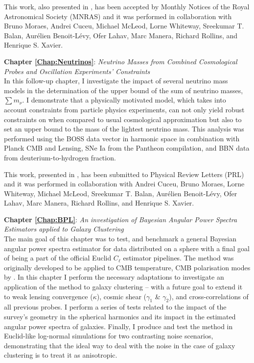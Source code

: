 \qquad This work, also presented in \cite{2018LoureiroBOSS}, has been accepted by Monthly Notices of the Royal Astronomical Society (MNRAS) and it was performed in collaboration with Bruno Moraes, Andrei Cuceu, Michael McLeod, Lorne Whiteway, Sreekumar T. Balan, Aur\'elien Benoit-L\'evy, Ofer Lahav, Marc Manera, Richard Rollins, and Henrique S. Xavier.

\bigskip

\textbf{Chapter \ref{Chap:Neutrinos}}: \textit{Neutrino Masses from Combined Cosmological Probes and Oscillation Experiments' Constraints} \\[0.6em]
In this follow-up chapter, I investigate the impact of several neutrino mass models in the determination of the upper bound of the sum of neutrino masses, $\sum m_{\nu}$. I demonstrate that a physically motivated model, which takes into account constraints from particle physics experiments, can not only yield robust constraints on \NM{} when compared to usual cosmological approximation but also to set an upper bound to the mass of the lightest neutrino mass. This analysis was performed using the BOSS data vector in harmonic space in combination with Planck CMB and Lensing, SNe Ia from the Pantheon compilation, and BBN data from deuterium-to-hydrogen fraction.

\qquad This work, presented in \cite{2018LoureiroNeutrinos}, has been submitted to Physical Review Letters (PRL) and it was performed in collaboration with  Andrei Cuceu, Bruno Moraes, Lorne Whiteway, Michael McLeod, Sreekumar T. Balan, Aur\'elien Benoit-L\'evy, Ofer Lahav, Marc Manera, Richard Rollins, and Henrique S. Xavier.

\bigskip

\textbf{Chapter \ref{Chap:BPL}}: \textit{An investigation of Bayesian Angular Power Spectra Estimators applied to Galaxy Clustering} \\[0.6em]
The main goal of this chapter was to test, and benchmark a general Bayesian angular power spectra estimator for data distributed on a sphere with a final goal of being a part of the official Euclid $C_{\ell}$ estimator pipelines. The method was originally developed to be applied to CMB temperature, CMB polarisation modes by \cite{SreeThesis}. In this chapter I perform the necessary adaptations to investigate an application of the method to galaxy clustering -- with a future goal to extend it to weak lensing convergence ($\kappa$), cosmic shear ($\gamma_1$ \& $\gamma_2$), and cross-correlations of all previous probes. I perform a series of tests related to the impact of the survey's geometry in the spherical harmonics and its impact in the estimated angular power spectra of galaxies. Finally, I produce and test the method in Euclid-like log-normal simulations for two contrasting noise scenarios, demonstrating that the ideal way to deal with the noise in the case of galaxy clustering is to treat it as anisotropic.

